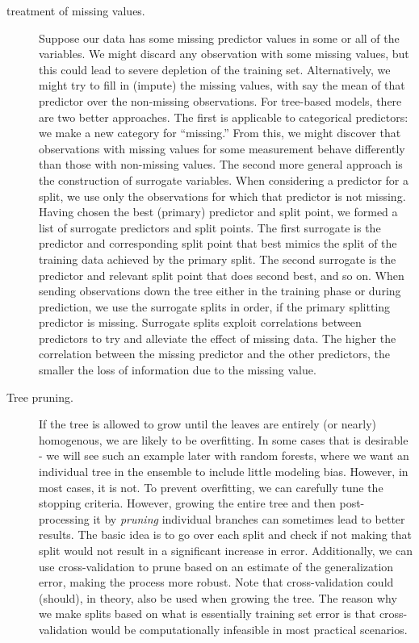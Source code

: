 \begin{refsection}
\begin{description}
\item[treatment of missing values.] Suppose our data has some missing predictor values in some or all of the variables. We might discard any observation with some missing values, but this could lead to severe depletion of the training set. Alternatively, we might try to fill in (impute) the missing values, with say the mean of that predictor over the non-missing observations. For tree-based models, there are two better approaches. The first is applicable to categorical predictors: we make a new category for “missing.” From this, we might discover that observations with missing values for some measurement behave differently than those with non-missing values. The second more general approach is the construction of surrogate variables. When considering a predictor for a split, we use only the observations for which that predictor is not missing. Having chosen the best (primary) predictor and split point, we formed a list of surrogate predictors and split points. The first surrogate is the predictor and corresponding split point that best mimics the split of the training data achieved by the primary split. The second surrogate is the predictor and relevant split point that does second best, and so on. When sending observations down the tree either in the training phase or during prediction, we use the surrogate splits in order, if the primary splitting predictor is missing. Surrogate splits exploit correlations between predictors to try and alleviate the effect of missing data. The higher the correlation between the missing predictor and the other predictors, the smaller the loss of information due to the missing value.

\item[Tree pruning.] If the tree is allowed to grow until the leaves are entirely (or nearly) homogenous, we are likely to be overfitting. In some cases that is desirable - we will see such an example later with random forests, where we want an individual tree in the ensemble to include little modeling bias. However, in most cases, it is not. To prevent overfitting, we can carefully tune the stopping criteria. However, growing the entire tree and then post-processing it by {\em pruning} individual branches can sometimes lead to better results. The basic idea is to go over each split and check if not making that split would not result in a significant increase in error.
Additionally, we can use cross-validation to prune based on an estimate of the generalization error, making the process more robust. Note that cross-validation could (should), in theory, also be used when growing the tree. The reason why we make splits based on what is essentially training set error is that cross-validation would be computationally infeasible in most practical scenarios.


\end{description}
\end{refsection}
